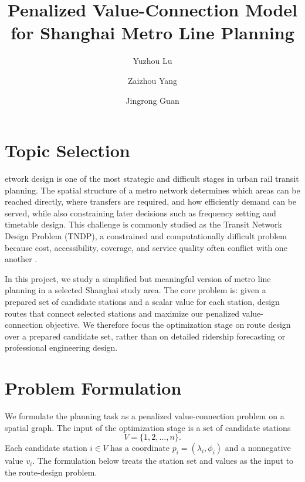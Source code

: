 \documentclass[9pt,a4paper,twocolumn,twoside]{tau-class/tau}
\title{Penalized Value-Connection Model for Shanghai Metro Line Planning}
\author[a,1]{Yuzhou Lu}
\author[a,2]{Zaizhou Yang}
\author[a,3]{Jingrong Guan}
\affil[a]{ShanghaiTech University}
\begin{document}
		
    \maketitle 
    \thispagestyle{firststyle}
    

\section{Topic Selection}

    etwork design is one of the most strategic and difficult stages in urban rail transit planning. The spatial structure of a metro network determines which areas can be reached directly, where transfers are required, and how efficiently demand can be served, while also constraining later decisions such as frequency setting and timetable design. This challenge is commonly studied as the Transit Network Design Problem (TNDP), a constrained and computationally difficult problem because cost, accessibility, coverage, and service quality often conflict with one another \cite{owais2026tndp}.

    In this project, we study a simplified but meaningful version of metro line planning in a selected Shanghai study area. The core problem is: given a prepared set of candidate stations and a scalar value for each station, design routes that connect selected stations and maximize our penalized value-connection objective. We therefore focus the optimization stage on route design over a prepared candidate set, rather than on detailed ridership forecasting or professional engineering design.



\section{Problem Formulation}

    We formulate the planning task as a penalized value-connection problem on a spatial graph. The input of the optimization stage is a set of candidate stations
    \[
        V = \{1,2,\ldots,n\}.
    \]
    Each candidate station $i \in V$ has a coordinate $p_i=(\lambda_i,\phi_i)$ and a nonnegative value $v_i$. The formulation below treats the station set and values as the input to the route-design problem.
\end{document}

